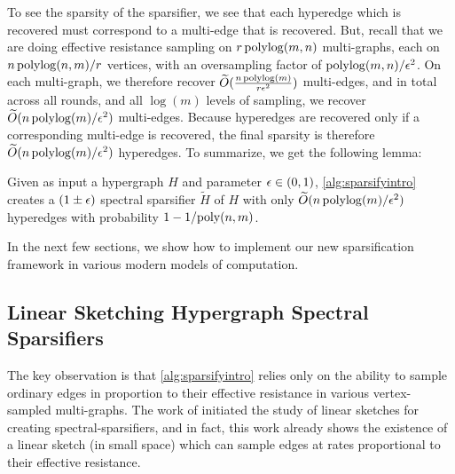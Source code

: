 \documentclass{article}
\begin{document}
To see the sparsity of the sparsifier, we see that each hyperedge which is recovered must correspond to a multi-edge that is recovered. But, recall that we are doing effective resistance sampling on $r \operatorname{polylog}(m,n)$ multi-graphs, each on $n \operatorname{polylog}(n,m) / r$ vertices, with an oversampling factor of $\operatorname{polylog}(m,n) / \epsilon^2$. On each multi-graph, we therefore recover $\widetilde{O}(\frac{n\operatorname{polylog}(m)}{r\epsilon^2})$ multi-edges, and in total across all rounds, and all $\log(m)$ levels of sampling, we recover $\widetilde{O}(n \operatorname{polylog}(m)/ \epsilon^2)$ multi-edges. Because hyperedges are recovered only if a corresponding multi-edge is recovered, the final sparsity is therefore $\widetilde{O}(n \operatorname{polylog}(m)/ \epsilon^2)$ hyperedges. To summarize, we get the following lemma:

\begin{lemma}\label{lem:correctnessSparsityintro}
   Given as input a hypergraph $H$ and parameter $\epsilon \in (0,1)$,  \cref{alg:sparsifyintro} creates a $(1 \pm \epsilon)$ spectral sparsifier $\widetilde{H}$ of $H$ with only $\widetilde{O}(n \operatorname{polylog}(m) / \epsilon^2)$ hyperedges with probability $1 - 1/\mathrm{poly}(n,m)$.
\end{lemma}

In the next few sections,
we show how to implement our new sparsification framework in various modern models
of computation.

\subsection{Linear Sketching Hypergraph Spectral Sparsifiers}

The key observation is that \cref{alg:sparsifyintro} relies only on the ability to sample ordinary edges in proportion to their effective resistance in various vertex-sampled multi-graphs. The work of \cite{KLMMS14} initiated the study of linear sketches for creating spectral-sparsifiers, and in fact, this work already shows the existence of a linear sketch (in small space) which can sample edges at rates proportional to their effective resistance. 
\end{document}
